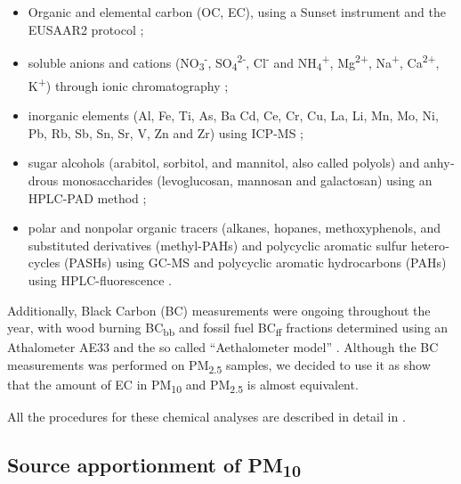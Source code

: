 \begin{otherlanguage}{english}
\begin{itemize}
\item
  Organic and elemental carbon (OC, EC), using a Sunset instrument and
  the EUSAAR2 protocol \parencite{aymozEvolution2004,cavalliEuropean2016};
\item
  soluble anions and cations (NO\textsubscript{3}\textsuperscript{-},
  SO\textsubscript{4}\textsuperscript{2-}, Cl\textsuperscript{-} and
  NH\textsubscript{4}\textsuperscript{+}, Mg\textsuperscript{2+},
  Na\textsuperscript{+}, Ca\textsuperscript{2+}, K\textsuperscript{+})
  through ionic chromatography \parencite{wakedSource2014};
\item
  inorganic elements (Al, Fe, Ti, As, Ba Cd, Ce, Cr, Cu, La, Li, Mn, Mo,
  Ni, Pb, Rb, Sb, Sn, Sr, V, Zn and Zr) using ICP-MS \parencite{wakedSource2014};
\item
  sugar alcohols (arabitol, sorbitol, and mannitol, also called polyols)
  and anhydrous monosaccharides (levoglucosan, mannosan and galactosan)
  using an HPLC-PAD method \parencite{wakedSource2014};
\item
  polar and nonpolar organic tracers (alkanes, hopanes, methoxyphenols,
  and substituted derivatives (methyl-PAHs) and polycyclic aromatic
  sulfur heterocycles (PASHs) using GC-MS and polycyclic aromatic
  hydrocarbons (PAHs) using HPLC-fluorescence \parencite{gollyLarge2015}.
\end{itemize}

Additionally, Black Carbon (BC) measurements were ongoing throughout the year,
with wood burning BC\textsubscript{bb} and fossil fuel BC\textsubscript{ff}
fractions determined using an Athalometer AE33 and the so called ``Aethalometer
model'' \parencite{sandradewiUsing2008,drinovecDualspot2015}.  Although the BC
measurements was performed on PM\textsubscript{2.5} samples, we decided to use
it as \textcite{jaffrezoSize2005,cavalliEuropean2016} show that the amount of EC in
PM\textsubscript{10} and PM\textsubscript{2.5} is almost equivalent.

All the procedures for these chemical analyses
are described in detail in \textcite{chevrierChauffage2016}.

\subsection{\texorpdfstring{Source apportionment of PM\textsubscript{10}}{Source
apportionment of PM10}}\label{source-apportionment-of-pm10}


\end{otherlanguage}
